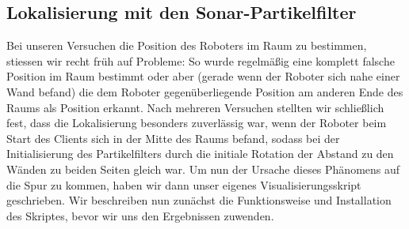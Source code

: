 \subsection{Lokalisierung mit den Sonar-Partikelfilter}
\label{sec:lokal-mit-den}
Bei unseren Versuchen die Position des Roboters im Raum zu bestimmen,
stiessen wir recht früh auf Probleme: So wurde regelmäßig eine
komplett falsche Position im Raum bestimmt oder aber (gerade wenn der
Roboter sich nahe einer Wand befand) die dem Roboter gegenüberliegende
Position am anderen Ende des Raums als Position erkannt.  Nach
mehreren Versuchen stellten wir schließlich fest, dass die
Lokalisierung besonders zuverlässig war, wenn der Roboter beim Start
des Clients sich in der Mitte des Raums befand, sodass bei der
Initialisierung des Partikelfilters durch die initiale Rotation der
Abstand zu den Wänden zu beiden Seiten gleich war. Um nun der Ursache
dieses Phänomens auf die Spur zu kommen, haben wir dann unser eigenes
Visualisierungsskript geschrieben. Wir beschreiben nun zunächst die
Funktionsweise und Installation des Skriptes, bevor wir uns den
Ergebnissen zuwenden.


%

